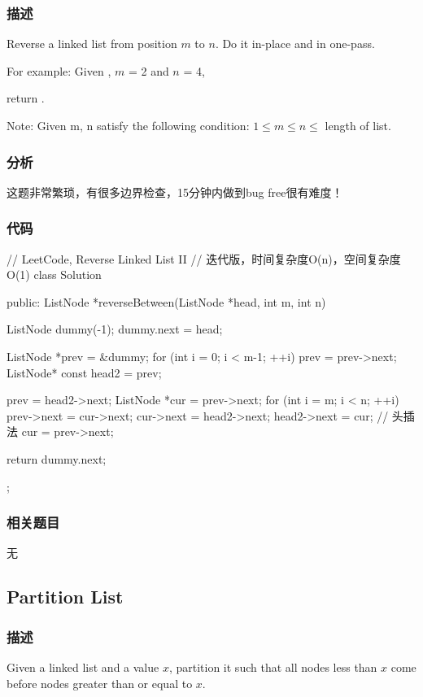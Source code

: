 \subsubsection{描述}
Reverse a linked list from position $m$ to $n$. Do it in-place and in one-pass.

For example:
Given , $m$ = 2 and $n$ = 4,

return .

Note:
Given m, n satisfy the following condition:
$1 \leq m \leq  n \leq $ length of list.


\subsubsection{分析}
这题非常繁琐，有很多边界检查，15分钟内做到bug free很有难度！


\subsubsection{代码}
\begin{Code}
	// LeetCode, Reverse Linked List II
	// 迭代版，时间复杂度O(n)，空间复杂度O(1)
	class Solution {
		public:
		ListNode *reverseBetween(ListNode *head, int m, int n) {
			ListNode dummy(-1);
			dummy.next = head;
			
			ListNode *prev = &dummy;
			for (int i = 0; i < m-1; ++i)
			prev = prev->next;
			ListNode* const head2 = prev;
			
			prev = head2->next;
			ListNode *cur = prev->next;
			for (int i = m; i < n; ++i) {
				prev->next = cur->next;
				cur->next = head2->next;
				head2->next = cur;  // 头插法
				cur = prev->next;
			}
			
			return dummy.next;
		}
	};
\end{Code}


\subsubsection{相关题目}

\begindot
\item 无
\myenddot


\subsection{Partition List}
\label{sec:partition-list}


\subsubsection{描述}
Given a linked list and a value $x$, partition it such that all nodes less than 
$x$ come before nodes greater than or equal to $x$.

